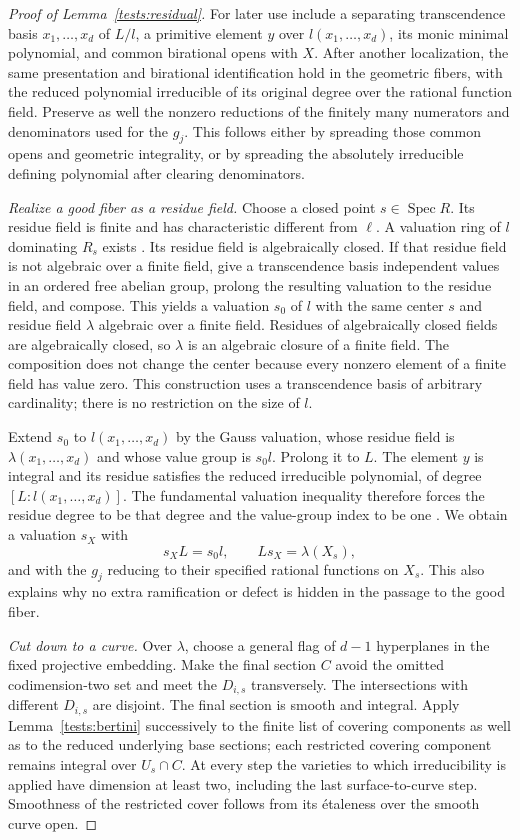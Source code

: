 \begin{proof}[Proof of Lemma~\ref{tests:residual}]
For later use include a separating transcendence basis
$x_1,\ldots,x_d$ of $L/l$, a primitive element $y$ over $l(x_1,\ldots,x_d)$,
its monic minimal polynomial, and common birational opens with $X$.
After another localization, the same presentation and birational
identification hold in the geometric fibers, with the reduced polynomial
irreducible of its original degree over the rational function field.
Preserve as well the nonzero reductions of the finitely many
numerators and denominators used for the $g_j$.
This follows either by spreading those common opens and geometric
integrality, or by spreading the absolutely irreducible defining
polynomial after clearing denominators.

\emph{Realize a good fiber as a residue field.}
Choose a closed point $s\in\operatorname{Spec}R$.
Its residue field is finite and has characteristic different from $\ell$.
A valuation ring of $l$ dominating $R_s$ exists
\cite[Lemma~10.50.2, Tag~00IA]{Stacks}.
Its residue field is algebraically closed.  If that residue field is
not algebraic over a finite field, give a transcendence basis independent
values in an ordered free abelian group, prolong the resulting valuation
to the residue field, and compose.  This yields a valuation $s_0$ of $l$
with the same center $s$ and residue field $\lambda$ algebraic over a
finite field.  Residues of algebraically closed fields are algebraically
closed, so $\lambda$ is an algebraic closure of a finite field.
The composition does not change the center because every nonzero
element of a finite field has value zero.
This construction uses a transcendence basis of arbitrary cardinality;
there is no restriction on the size of $l$.

Extend $s_0$ to $l(x_1,\ldots,x_d)$ by the Gauss valuation, whose residue
field is $\lambda(x_1,\ldots,x_d)$ and whose value group is $s_0l$.
Prolong it to $L$.  The element $y$ is integral and its residue satisfies
the reduced irreducible polynomial, of degree
$[L:l(x_1,\ldots,x_d)]$.  The fundamental valuation inequality therefore
forces the residue degree to be that degree and the value-group index
to be one \cite[Section~15.125, Tag~0ASF]{Stacks}.
We obtain a valuation $s_X$ with
\[
 s_XL=s_0l,\qquad Ls_X=\lambda(X_s),
\]
and with the $g_j$ reducing to their specified rational functions on
$X_s$.  This also explains why no extra ramification or defect is hidden
in the passage to the good fiber.

\emph{Cut down to a curve.}
Over $\lambda$, choose a general flag of $d-1$ hyperplanes in the fixed
projective embedding.  Make the final section $C$ avoid the omitted
codimension-two set and meet the $D_{i,s}$ transversely.
The intersections with different $D_{i,s}$ are disjoint.
The final section is smooth and integral.  Apply
Lemma~\ref{tests:bertini} successively to the finite list of covering
components as well as to the reduced underlying base sections; each restricted covering
component remains integral over $U_s\cap C$.
At every step the varieties to which irreducibility is applied have
dimension at least two, including the last surface-to-curve step.
Smoothness of the restricted cover follows from its \'etaleness over the
smooth curve open.


\end{proof}
